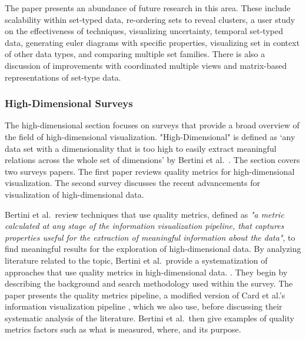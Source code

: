 The paper presents an abundance of future research in this area. These include scalability within set-typed data, re-ordering sets to reveal clusters, a user study on the effectiveness of techniques, visualizing uncertainty, temporal set-typed data, generating euler diagrams with specific properties, visualizing set in context of other data types, and comparing multiple set families. There is also a discussion of improvements with coordinated multiple views and matrix-based representations of set-type data.


\subsubsection{High-Dimensional Surveys}
The high-dimensional section focuses on surveys that provide a broad overview of the field of high-dimensional visualization. "High-Dimensional" is defined as `any data set with a dimensionality that is too high to easily extract meaningful relations across the whole set of dimensions' by Bertini et al.\ \cite{bertini2011quality}. The section covers two surveys papers. The first paper reviews quality metrics for high-dimensional visualization. The second survey discusses the recent advancements for visualization of high-dimensional data.

Bertini et al.\ review techniques that use quality metrics, defined as \textit{"a metric calculated at any stage of the information visualization pipeline, that captures properties useful for the extraction of meaningful information about the data"}, to find meaningful results for the exploration of high-dimensional data. By analyzing literature related to the topic, Bertini et al.\ provide a systematization of approaches that use quality metrics in high-dimensional data. \cite{bertini2011quality}.
They begin by describing the background and search methodology used within the survey. The paper presents the quality metrics pipeline, a modified version of Card et al.'s information visualization pipeline \cite{card1999readings}, which we also use, before discussing their systematic analysis of the literature. Bertini et al.\ then give examples of quality metrics factors such as what is measured, where, and its purpose.

